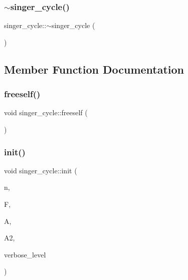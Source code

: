 \mbox{\label{classsinger__cycle_a6bb69cd5e023ec4f8d5bb44ebba09d5b}} 
\subsubsection{\texorpdfstring{$\sim$singer\+\_\+cycle()}{~singer\_cycle()}}
{\footnotesize\ttfamily singer\+\_\+cycle\+::$\sim$singer\+\_\+cycle (\begin{DoxyParamCaption}{ }\end{DoxyParamCaption})}



\subsection{Member Function Documentation}
\mbox{\label{classsinger__cycle_a5c42f269d17c204e0c7944220818b3cd}} 
\subsubsection{\texorpdfstring{freeself()}{freeself()}}
{\footnotesize\ttfamily void singer\+\_\+cycle\+::freeself (\begin{DoxyParamCaption}{ }\end{DoxyParamCaption})}

\mbox{\label{classsinger__cycle_a81f4ff6af04557deb4e65cf559e2c91d}} 
\subsubsection{\texorpdfstring{init()}{init()}}
{\footnotesize\ttfamily void singer\+\_\+cycle\+::init (\begin{DoxyParamCaption}\item[{\mbox{\hyperlink{galois_8h_a09fddde158a3a20bd2dcadb609de11dc}{I\+NT}}}]{n,  }\item[{\mbox{\hyperlink{classfinite__field}{finite\+\_\+field}} $\ast$}]{F,  }\item[{\mbox{\hyperlink{classaction}{action}} $\ast$}]{A,  }\item[{\mbox{\hyperlink{classaction}{action}} $\ast$}]{A2,  }\item[{\mbox{\hyperlink{galois_8h_a09fddde158a3a20bd2dcadb609de11dc}{I\+NT}}}]{verbose\+\_\+level }\end{DoxyParamCaption})}

